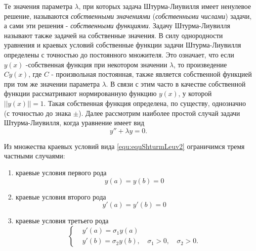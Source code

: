          Те значения параметра $\lambda$, при которых задача Штурма-Лиувилля имеет ненулевое решение, называются \textit{собственными значениями} (\textit{собственными числами}) задачи, а сами эти решения - \textit{собственными функциями}. Задачу Штурма-Лиувилля называют также задачей на собственные значения. В силу однородности уравнения и краевых условий собственные функции задачи Штурма-Лиувилля определены с точностью до постоянного множителя. Это означает, что если $y(x)$ -собственная функция при некотором значении $\lambda$, то произведение $Cy(x)$, где $C$ - произвольная постоянная, также является собственной функцией при том же значении параметра $\lambda$. В связи с этим часто в качестве собственной функции рассматривают нормированную функцию $y(x)$, у которой $||y(x)|| = 1$. Такая собственная функция определена, по существу, однозначно (с точностью до знака $\pm$). Далее рассмотрим наиболее простой случай задачи Штурма-Лиувилля, когда уравнение имеет вид   
 \begin{equation}
	y'' + \lambda  y = 0.
	\label{equ:equShturmLeuv4}
 \end{equation}


Из множества краевых условий вида \eqref{equ:equShturmLeuv2} ограничимся тремя частными случаями:
\begin{enumerate} \setlength\itemsep{0ex}
	\item краевые условия первого рода   \[y(a) = y(b) = 0\]
	\item краевые условия второго рода  \[y'(a) = y'(b) = 0\]
	\item краевые условия третьего рода 
	\[
		\left\{
			\begin{aligned}
				&y'(a) = \sigma_1 y(a)\\
				&y'(b) = \sigma_2 y(b), \quad \sigma_1 > 0, \quad  \sigma_2 > 0.
			\end{aligned}
		\right.
	\]
\end{enumerate}

